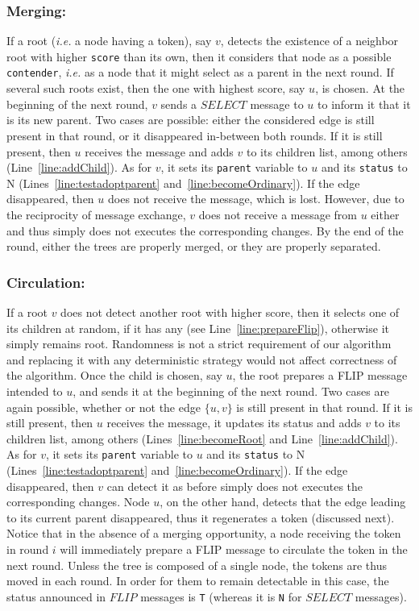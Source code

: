 \documentclass[twocolumn]{article}
\begin{document}
\subsubsection{Merging:} 
If a root ({\it i.e.} a node having a token), say $v$, detects the
existence of a neighbor root with higher {\tt score} than its own,
then it considers that node as a possible \texttt{contender}, {\it
  i.e.} as a node that it might select as a parent in the next round.
If several such roots exist, then the one with highest score, say $u$,
is chosen. At the beginning of the next round, $v$ sends a $SELECT$
message to $u$ to inform it that it is its new parent. Two cases are
possible: either the considered edge is still present in that round,
or it disappeared in-between both rounds. If it is still present, then
$u$ receives the message and adds $v$ to its children list, among others
(Line~\ref{line:addChild}). As for $v$, it sets its {\tt parent}
variable to $u$ and its {\tt status} to N
(Lines~\ref{line:testadoptparent} and~\ref{line:becomeOrdinary}). If
the edge disappeared, then $u$ does not receive the message, which is
lost. However, due to the reciprocity of message exchange, $v$ does
not receive a message from $u$ either and thus simply does not
executes the corresponding changes. By the end of the round, either
the trees are properly merged, or they are properly separated.


\subsubsection{Circulation:} If a root $v$ does not detect another
root with higher score, then it selects one of its children at random,
if it has any (see Line~\ref{line:prepareFlip}), otherwise it simply
remains root. Randomness is not a strict requirement of our algorithm
and replacing it with any deterministic strategy would not affect
correctness of the algorithm. Once the child is chosen, say $u$, the
root prepares a FLIP message intended to $u$, and sends it at the
beginning of the next round. Two cases are again possible, whether or
not the edge $\{u,v\}$ is still present in that round. If it is still
present, then $u$ receives the message, it updates its status and adds
$v$ to its children list, among others (Lines~\ref{line:becomeRoot}
and Line~\ref{line:addChild}). As for $v$, it sets its {\tt parent}
variable to $u$ and its {\tt status} to N
(Lines~\ref{line:testadoptparent} and~\ref{line:becomeOrdinary}). If
the edge disappeared, then $v$ can detect it as before simply does not
executes the corresponding changes. Node $u$, on the other hand,
detects that the edge leading to its current parent disappeared, thus
it regenerates a token (discussed next). Notice that in the absence of
a merging opportunity, a node receiving the token in round $i$ will
immediately prepare a FLIP message to circulate the token in the next
round. Unless the tree is composed of a single node, the tokens are
thus moved in each round. In order for them to remain detectable in
this case, the status announced in $FLIP$ messages is {\tt T} (whereas
it is {\tt N} for $SELECT$ messages).
\end{document}
